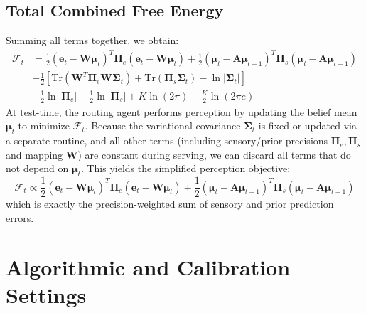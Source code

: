 \documentclass{article}
\theoremstyle{plain}
\theoremstyle{definition}
\theoremstyle{remark}
\begin{document}
\subsection{Total Combined Free Energy}
Summing all terms together, we obtain:
\begin{align}
\mathcal{F}_t &= \frac{1}{2} (\mathbf{e}_t - \mathbf{W}\mathbf{\mu}_t)^T \mathbf{\Pi}_e (\mathbf{e}_t - \mathbf{W}\mathbf{\mu}_t) + \frac{1}{2} (\mathbf{\mu}_t - \mathbf{A}\mathbf{\mu}_{t-1})^T \mathbf{\Pi}_s (\mathbf{\mu}_t - \mathbf{A}\mathbf{\mu}_{t-1}) \nonumber \\
&+ \frac{1}{2} \left[ \text{Tr}\left(\mathbf{W}^T \mathbf{\Pi}_e \mathbf{W} \mathbf{\Sigma}_t\right) + \text{Tr}\left(\mathbf{\Pi}_s \mathbf{\Sigma}_t\right) - \ln|\mathbf{\Sigma}_t| \right] \nonumber \\
&- \frac{1}{2}\ln|\mathbf{\Pi}_e| - \frac{1}{2}\ln|\mathbf{\Pi}_s| + K\ln(2\pi) - \frac{K}{2}\ln(2\pi e)
\end{align}
At test-time, the routing agent performs perception by updating the belief mean $\mathbf{\mu}_t$ to minimize $\mathcal{F}_t$. Because the variational covariance $\mathbf{\Sigma}_t$ is fixed or updated via a separate routine, and all other terms (including sensory/prior precisions $\mathbf{\Pi}_e, \mathbf{\Pi}_s$ and mapping $\mathbf{W}$) are constant during serving, we can discard all terms that do not depend on $\mathbf{\mu}_t$. This yields the simplified perception objective:
\begin{equation}
\mathcal{F}_t \propto \frac{1}{2} (\mathbf{e}_t - \mathbf{W}\mathbf{\mu}_t)^T \mathbf{\Pi}_e (\mathbf{e}_t - \mathbf{W}\mathbf{\mu}_t) + \frac{1}{2} (\mathbf{\mu}_t - \mathbf{A}\mathbf{\mu}_{t-1})^T \mathbf{\Pi}_s (\mathbf{\mu}_t - \mathbf{A}\mathbf{\mu}_{t-1})
\end{equation}
which is exactly the precision-weighted sum of sensory and prior prediction errors.

\section{Algorithmic and Calibration Settings}
\label{app:calibration}
\end{document}
